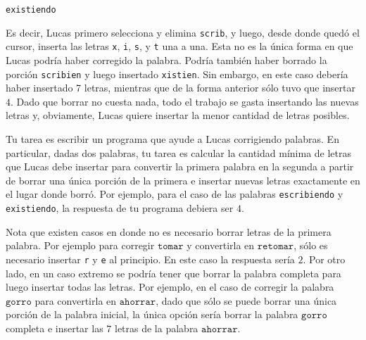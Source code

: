 \documentclass{oci}
\begin{document}
\begin{problemDescription}
\begin{center}
\begin{minipage}{100pt}
    \texttt{exist\caret{}iendo}    
  \end{minipage}
  \end{center}

  Es decir, Lucas primero selecciona y elimina \texttt{scrib}, y luego, desde donde quedó el cursor,
  inserta las letras \texttt{x}, \texttt{i}, \texttt{s}, y \texttt{t} una a una.
  Esta no es la única forma en que Lucas podría haber corregido la palabra.
  Podría también haber borrado la porción \texttt{scribien} y luego insertado
  \texttt{xistien}. Sin embargo, en este caso debería haber insertado 7 letras, mientras
  que de la forma anterior sólo tuvo que insertar $4$.
  Dado que borrar no cuesta nada, todo el trabajo se gasta insertando las nuevas letras y,
  obviamente, Lucas quiere insertar la menor cantidad de letras posibles.

	Tu tarea es escribir un programa que ayude a Lucas corrigiendo palabras.
	En particular, dadas dos palabras, tu tarea es calcular la cantidad mínima de letras
	que Lucas debe insertar para convertir la primera palabra en la segunda a partir de
	borrar una única porción de la primera e insertar nuevas letras exactamente en el lugar donde borró.
	Por ejemplo, para el caso de las palabras \texttt{escribiendo} y \texttt{existiendo}, la respuesta
	de tu programa debiera ser $4$.
	
	Nota que existen casos en donde no es necesario borrar letras de la primera palabra. 
	Por ejemplo para corregir $\texttt{tomar}$ y convertirla en $\texttt{retomar}$,
	sólo es necesario insertar \texttt{r} y \texttt{e} al principio. En este caso la respuesta sería $2$.
	Por otro lado, en un caso extremo 
	se podría tener que borrar la palabra completa para luego insertar todas las letras.
	Por ejemplo, en el caso de corregir la palabra $\texttt{gorro}$ para convertirla en $\texttt{ahorrar}$,
	dado que sólo se puede borrar una única porción de la palabra inicial,
	la única opción sería borrar la palabra $\texttt{gorro}$ completa e insertar las $7$ letras de la palabra 
	$\texttt{ahorrar}$.
	


\end{problemDescription}
\end{document}
